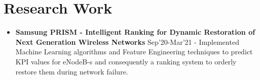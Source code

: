 \documentclass{article}
\begin{document}
\begin{itemize}


\end{itemize}



\section*{Research Work}
\begin{itemize}
    \item{\textbf{\large{Samsung PRISM - Intelligent Ranking for Dynamic Restoration of Next Generation Wireless Networks}}} \hfill \textmd{Sep'20-Mar'21}
          \newline
          \textmd{- Implemented Machine Learning algorithms and Feature Engineering techniques to predict KPI values for eNodeB-s and consequently a ranking system to orderly restore them during network failure.}
\end{itemize}

\end{document}
